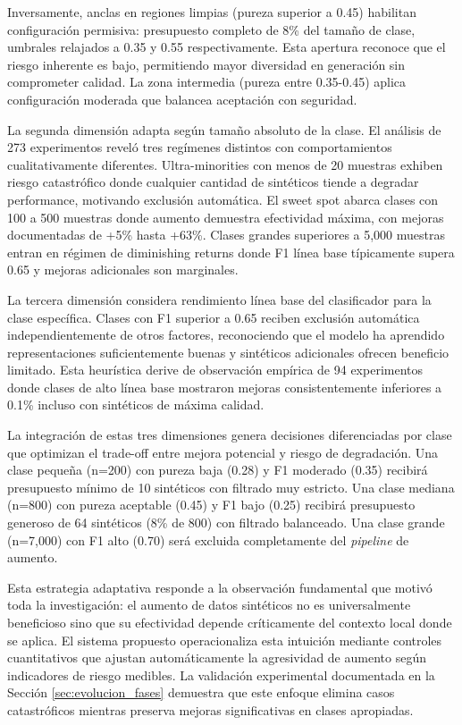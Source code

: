 Inversamente, anclas en regiones limpias (pureza superior a 0.45) habilitan configuración permisiva: presupuesto completo de 8\% del tamaño de clase, umbrales relajados a 0.35 y 0.55 respectivamente. Esta apertura reconoce que el riesgo inherente es bajo, permitiendo mayor diversidad en generación sin comprometer calidad. La zona intermedia (pureza entre 0.35-0.45) aplica configuración moderada que balancea aceptación con seguridad.

La segunda dimensión adapta según tamaño absoluto de la clase. El análisis de 273 experimentos reveló tres regímenes distintos con comportamientos cualitativamente diferentes. Ultra-minorities con menos de 20 muestras exhiben riesgo catastrófico donde cualquier cantidad de sintéticos tiende a degradar performance, motivando exclusión automática. El sweet spot abarca clases con 100 a 500 muestras donde aumento demuestra efectividad máxima, con mejoras documentadas de +5\% hasta +63\%. Clases grandes superiores a 5,000 muestras entran en régimen de diminishing returns donde F1 línea base típicamente supera 0.65 y mejoras adicionales son marginales.

La tercera dimensión considera rendimiento línea base del clasificador para la clase específica. Clases con F1 superior a 0.65 reciben exclusión automática independientemente de otros factores, reconociendo que el modelo ha aprendido representaciones suficientemente buenas y sintéticos adicionales ofrecen beneficio limitado. Esta heurística derive de observación empírica de 94 experimentos donde clases de alto línea base mostraron mejoras consistentemente inferiores a 0.1\% incluso con sintéticos de máxima calidad.

La integración de estas tres dimensiones genera decisiones diferenciadas por clase que optimizan el trade-off entre mejora potencial y riesgo de degradación. Una clase pequeña (n=200) con pureza baja (0.28) y F1 moderado (0.35) recibirá presupuesto mínimo de 10 sintéticos con filtrado muy estricto. Una clase mediana (n=800) con pureza aceptable (0.45) y F1 bajo (0.25) recibirá presupuesto generoso de 64 sintéticos (8\% de 800) con filtrado balanceado. Una clase grande (n=7,000) con F1 alto (0.70) será excluida completamente del \textit{pipeline} de aumento.

Esta estrategia adaptativa responde a la observación fundamental que motivó toda la investigación: el aumento de datos sintéticos no es universalmente beneficioso sino que su efectividad depende críticamente del contexto local donde se aplica. El sistema propuesto operacionaliza esta intuición mediante controles cuantitativos que ajustan automáticamente la agresividad de aumento según indicadores de riesgo medibles. La validación experimental documentada en la Sección \ref{sec:evolucion_fases} demuestra que este enfoque elimina casos catastróficos mientras preserva mejoras significativas en clases apropiadas.

